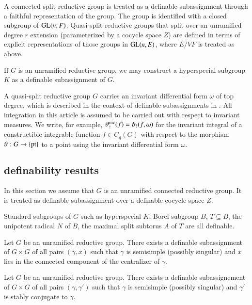 A connected split reductive group is treated as a definable
subassignment through a faithful representation of the group.  The
group is identified with a closed subgroup of ${\operatorname{GL}}(n,F)$.
Quasi-split reductive groups that split over an unramified degree $r$
extension (parameterized by a cocycle space $Z$) are defined in terms
of explicit representations of those groups in ${\operatorname{GL}}(n,E)$, where
$E/VF$ is treated as above.

If $G$ is an unramified reductive group, we may construct a
hyperspecial subgroup $K$ as a definable subassignment of $G$.

A quasi-split reductive group $G$ carries an invariant differential
form $\omega$ of top degree, which is described in the context of
definable subassignments in \cite{gordon}.
All integration in this article is assumed to be carried out with
respect to invariant measures.  We write, for example,
$\vartheta_!^{\operatorname{inv}}(f) = \vartheta_!(f,\omega)$ for the invariant
integral of a constructible integrable function $f\in C_q(G)$ with
respect to the morphism $\vartheta:G\to\{{\operatorname{pt}}\}$ to a point using
the invariant differential form $\omega$.

\subsection{definability results}\label{sec:definability}

In this section we assume that $G$ is an unramified connected
reductive group.  It is treated as definable subassignment over a
definable cocycle space $Z$.

Standard subgroups of $G$ such as hyperspecial $K$, Borel subgroup
$B$, $T\subseteq B$, the unipotent radical $N$ of $B$, the maximal
split subtorus $A$ of $T$ are all definable.


\begin{lemma}  
  Let $G$ be an unramified reductive group.  There exists a definable
  subassignment of $G\times G$ of all pairs $(\gamma,x)$ such that
  $\gamma$ is semisimple (possibly singular) and $x$ lies in the
  connected component of the centralizer of $\gamma$.
\end{lemma}

\begin{lemma} 
  Let $G$ be an unramified reductive group.  There exists a definable
  subassignement of $G\times G$ of all pairs $(\gamma,\gamma')$ such
  that $\gamma$ is semisimple (possibly singular) and $\gamma'$ is
  stably conjugate to $\gamma$.
\end{lemma}

